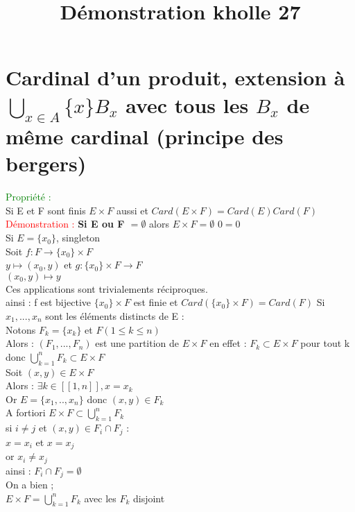 \documentclass{article}
\begin{document}
\title{Démonstration kholle 27}
\date{}
\maketitle
\renewcommand{\thesection}{\Roman{section}}
\setlength{\parindent}{1.5cm}
\section{Cardinal d'un produit, extension à $\bigcup_{x\in A} \lbrace x \rbrace B_x$ avec tous les $B_x$ de  même cardinal (principe des bergers)}
\textcolor{green}{Propriété :} \\
Si E et F sont finis $E \times F $ aussi et $Card(E \times F)= Card(E) Card(F)$ \\
\textcolor{red}{Démonstration :}
{\bf \boldmath Si E ou F $= \emptyset$} alors $E \times F= \emptyset$ $0=0$ \\
Si $E= \lbrace x_0 \rbrace$, singleton \\
Soit $f: F \rightarrow \lbrace x_0 \rbrace \times F $ \\
$y \mapsto (x_0,y)$
et $g : \lbrace x_0 \rbrace \times F \rightarrow F$ \\
$(x_0,y) \mapsto y$ \\
Ces applications sont trivialements réciproques. \\
ainsi : f est bijective $\lbrace x_0 \rbrace \times F$ est finie et $Card(\lbrace x_0 \rbrace \times F)= Card(F) $
Si $x_1,..., x_n$ sont les éléments distincts de E : \\
Notons $F_k= \lbrace x_k \rbrace $ et $F(1 \leq k \leq n)$ \\
Alors : $(F_1,...,F_n)$ est une partition de $E \times F$
en effet :
$F_k \subset E \times F$ pour tout k donc $\bigcup_{k=1}^n F_k \subset E \times F$ \\
Soit $(x,y) \in E \times F$ \\
Alors : $\exists k \in [[1,n]],x=x_k$ \\
Or $E= \lbrace x_1,..,x_n \rbrace $ donc $(x,y) \in F_k$ \\
A fortiori  $E \times F \subset \bigcup_{k=1}^n F_k$ \\
si $i \neq j$ et $(x,y) \in F_i \cap F_j$ : \\
$x=x_i$ et $x=x_j$ \\
or $x_i\neq x_j $ \\
ainsi : $F_i \cap F_j = \emptyset $ \\
On a bien ; \\
$E \times F= \bigcup_{k=1}^n F_k$  avec les $F_k$ disjoint \\
\end{document}
